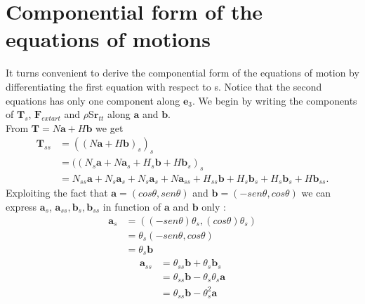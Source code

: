 

\section{Componential form of the equations of motions}\label{componential-form-of-the-equations-of-motion}
It turns convenient to derive the componential form of the equations of motion by differentiating the first equation with respect to s.
Notice that the second equations has only one component along $\mathbf{e}_3$.
We begin by writing the components of $\mathbf{T}_s$, $\mathbf{F}_{extart}$ and $\rho$S$\mathbf{r}_{tt}$ along $\mathbf{a}$ and $\mathbf{b}$.\\
From $\mathbf{T}=N\mathbf{a}+H\mathbf{b}$ we get
\begin{equation}
\begin{split}
\mathbf{T}_{ss}& =((N\mathbf{a}+H\mathbf{b})_s)_s\\
               & =((N_s\mathbf{a}+ N\mathbf{a}_s + H_s\mathbf{b} + H\mathbf{b}_s)_s\\
               & = N_{ss}\mathbf{a} + N_s\mathbf{a}_s + N_s\mathbf{a}_s + N\mathbf{a}_{ss} + H_{ss}\mathbf{b} + H_s\mathbf{b}_s + H_s\mathbf{b}_s + H\mathbf{b}_{ss}.
\end{split}
\end{equation}
Exploiting the fact that $\mathbf{a}=(cos\theta, sen\theta)$ and $\mathbf{b}=(-sen\theta, cos\theta)$ we can express $\mathbf{a}_s$, $\mathbf{a}_{ss}, \mathbf{b}_s, \mathbf{b}_{ss}$ in function of $\mathbf{a}$ and $\mathbf{b}$ only :
\begin{equation}
\begin{split}
\mathbf{a}_s& = ((-sen\theta)\theta_s, (cos\theta)\theta_s)\\
            & = \theta_s(-sen\theta, cos\theta)\\
            & =\theta_s\mathbf{b}
\end{split}
\end{equation}
\begin{equation}
\begin{split}
\mathbf{a}_{ss}& = \theta_{ss}\mathbf{b}+\theta_s\mathbf{b}_s \\
               & = \theta_{ss}\mathbf{b} - \theta_s\theta_s\mathbf{a}\\
               & = \theta_{ss}\mathbf{b} - \theta_s^2\mathbf{a}
\end{split}
\end{equation}

 
 
 
 
 
 
  
  
  
  
  
  
  
  
  
  
  
  